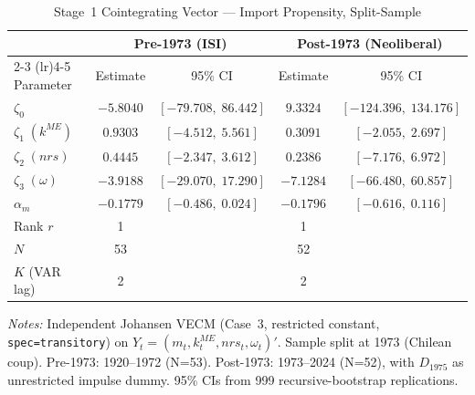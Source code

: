 \begin{table}[htbp]
\centering
\caption{Stage~1 Cointegrating Vector --- Import Propensity, Split-Sample}
\label{tab:stage1_cv1}
\begin{tabular}{lcccc}
\toprule
 & \multicolumn{2}{c}{Pre-1973 (ISI)} & \multicolumn{2}{c}{Post-1973 (Neoliberal)} \\
\cmidrule(lr){2-3} \cmidrule(lr){4-5}
Parameter & Estimate & 95\% CI & Estimate & 95\% CI \\
\midrule
$\zeta_0$ & $-5.8040$ & $[-79.708,\; 86.442]$ & $9.3324$ & $[-124.396,\; 134.176]$ \\
$\zeta_1\;(k^{ME})$ & $0.9303$ & $[-4.512,\; 5.561]$ & $0.3091$ & $[-2.055,\; 2.697]$ \\
$\zeta_2\;(nrs)$ & $0.4445$ & $[-2.347,\; 3.612]$ & $0.2386$ & $[-7.176,\; 6.972]$ \\
$\zeta_3\;(\omega)$ & $-3.9188$ & $[-29.070,\; 17.290]$ & $-7.1284$ & $[-66.480,\; 60.857]$ \\
\midrule
$\alpha_m$ & $-0.1779$ & $[-0.486,\; 0.024]$ & $-0.1796$ & $[-0.616,\; 0.116]$ \\
Rank $r$ & 1 & & 1 & \\
$N$ & 53 & & 52 & \\
$K$ (VAR lag) & 2 & & 2 & \\
\bottomrule
\end{tabular}
\vspace{0.5em}
\begin{minipage}{0.95\textwidth}
\footnotesize
\textit{Notes:} Independent Johansen VECM (Case~3, restricted constant, \texttt{spec=transitory}) on $Y_t = (m_t, k_t^{ME}, nrs_t, \omega_t)'$. Sample split at 1973 (Chilean coup). Pre-1973: 1920--1972 (N=53). Post-1973: 1973--2024 (N=52), with $D_{1975}$ as unrestricted impulse dummy. 95\% CIs from 999 recursive-bootstrap replications.
\end{minipage}
\end{table}
